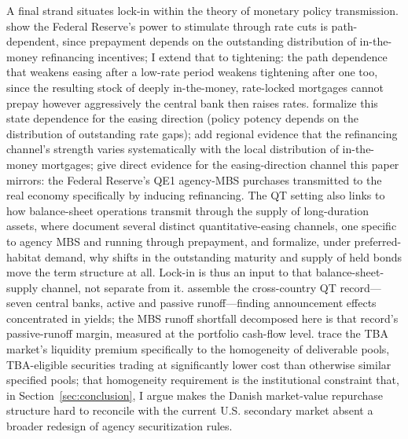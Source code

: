 \documentclass[12pt]{article}
\begin{document}
A final strand situates lock-in within the theory of monetary policy transmission. \citet{berger2021} show the Federal Reserve's power to stimulate through rate cuts is path-dependent, since prepayment depends on the outstanding distribution of in-the-money refinancing incentives; I extend that to tightening: the path dependence that weakens easing after a low-rate period weakens tightening after one too, since the resulting stock of deeply in-the-money, rate-locked mortgages cannot prepay however aggressively the central bank then raises rates. \citet{eichenbaum2022} formalize this state dependence for the easing direction (policy potency depends on the distribution of outstanding rate gaps); \citet{beraja2019} add regional evidence that the refinancing channel's strength varies systematically with the local distribution of in-the-money mortgages; \citet{dimaggio2020} give direct evidence for the easing-direction channel this paper mirrors: the Federal Reserve's QE1 agency-MBS purchases transmitted to the real economy specifically by inducing refinancing. The QT setting also links to how balance-sheet operations transmit through the supply of long-duration assets, where \citet{krishnamurthy2011} document several distinct quantitative-easing channels, one specific to agency MBS and running through prepayment, and \citet{vayanos2021} formalize, under preferred-habitat demand, why shifts in the outstanding maturity and supply of held bonds move the term structure at all. Lock-in is thus an input to that balance-sheet-supply channel, not separate from it. \citet{du2024} assemble the cross-country QT record---seven central banks, active and passive runoff---finding announcement effects concentrated in yields; the MBS runoff shortfall decomposed here is that record's passive-runoff margin, measured at the portfolio cash-flow level. \citet{vickery2013} trace the TBA market's liquidity premium specifically to the homogeneity of deliverable pools, TBA-eligible securities trading at significantly lower cost than otherwise similar specified pools; that homogeneity requirement is the institutional constraint that, in Section~\ref{sec:conclusion}, I argue makes the Danish market-value repurchase structure hard to reconcile with the current U.S. secondary market absent a broader redesign of agency securitization rules.
\end{document}
